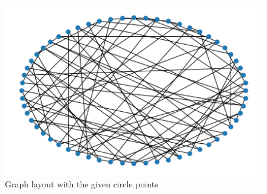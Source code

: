 \documentclass[12pt]{exam}
\begin{document}
\begin{questions}
  \begin{figure}[hpb!]
    \centering
    \includegraphics[scale=0.9]{data/circle_graph.png}
    \caption{Graph layout with the given circle points}
    \label{fig:circle_connectivity}
  \end{figure}



\end{questions}
\end{document}
